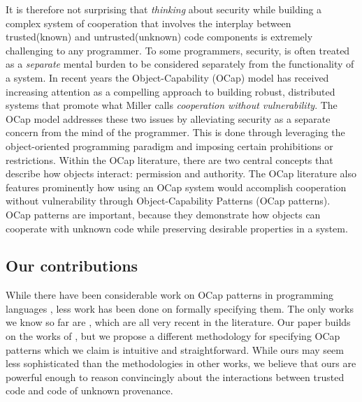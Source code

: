 \documentclass[a4paper,11pt,twoside]{article}
\begin{document}
It is therefore not surprising that \textit{thinking} about security while building a complex system of cooperation that involves the interplay between trusted(known) and untrusted(unknown) code components is extremely challenging to any programmer. To some programmers, security, is often treated as a \textit{separate} mental burden to be considered separately from the functionality of a system. In recent years the Object-Capability (OCap) model has received increasing attention as a compelling approach to building robust, distributed systems that promote what Miller\cite{miller2006} calls \textit{cooperation without vulnerability}. The OCap model addresses these two issues by alleviating security as a separate concern from the mind of the programmer. This is done through leveraging the object-oriented programming paradigm and imposing certain prohibitions or restrictions. Within the OCap literature, there are two central concepts that describe how objects interact: permission and authority. The OCap literature also features prominently how using an OCap system would accomplish cooperation without vulnerability through Object-Capability Patterns (OCap patterns). OCap patterns are important, because they demonstrate how objects can cooperate with unknown code while preserving desirable properties in a system.\\
\subsection{Our contributions}
While there have been considerable work on OCap patterns in programming languages \cite{miller2003b,miller2006,murray2010,drossopoulou2014b}, less work has been done on formally specifying them. The only works we know so far are \cite{drossopoulou2015b,devriese2016,swasey2017}, which are all very recent in the literature. Our paper builds on the works of \cite{drossopoulou2015b}, but we propose a different methodology for specifying OCap patterns which we claim is intuitive and straightforward. While ours may seem less sophisticated than the methodologies in other works, we believe that ours are powerful enough to reason convincingly about the interactions between trusted code and code of unknown provenance.\\
\end{document}
